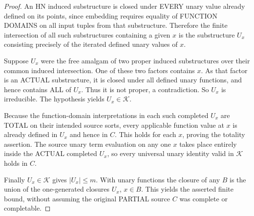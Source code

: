\begin{proof}
An HN induced substructure is closed under
EVERY unary value already defined on its points,
since embedding requires equality of FUNCTION
DOMAINS on all input tuples from that substructure.
Therefore the finite intersection of all such
substructures containing a given $x$ is the
substructure $U_x$ consisting precisely of the
iterated defined unary values of $x$.

Suppose $U_x$ were the free amalgam of two
proper induced substructures over their
common induced intersection. One of these
two factors contains $x$. As that factor
is an ACTUAL substructure, it is closed
under all defined unary functions, and
hence contains ALL of $U_x$. Thus it is
not proper, a contradiction. So $U_x$
is irreducible. The hypothesis yields
$U_x\in\mathcal K$.

Because the function-domain interpretations
in each such completed $U_x$ are TOTAL on
their intended source sorts, every applicable
function value at $x$ is already defined in
$U_x$ and hence in $C$. This holds for each
$x$, proving the totality assertion.
The source unary term evaluation on any one
$x$ takes place entirely inside the ACTUAL
completed $U_x$, so every universal unary
identity valid in $\mathcal K$ holds in $C$.

Finally $U_x\in\mathcal K$ gives $|U_x|\le m$.
With unary functions the closure of any $B$
is the union of the one-generated closures
$U_x$, $x\in B$. This yields the asserted
finite bound, without assuming the original
PARTIAL source $C$ was complete or completable.
\end{proof}
